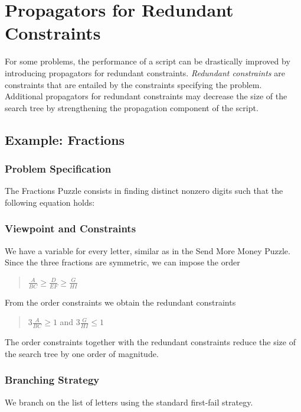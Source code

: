 \documentclass[a4paper,halfparskip]{scrartcl}
\begin{document}
\newpage
\section{Propagators for Redundant Constraints}
\label{redundant}
For some problems, the performance of a script can 
be drastically improved by introducing propagators 
for redundant constraints. \emph{Redundant constraints} are 
constraints that are entailed by the constraints specifying 
the problem. Additional propagators for redundant constraints 
may decrease the size of the search tree by strengthening 
the propagation component of the script.

\subsection{Example: Fractions}
\subsubsection{Problem Specification}
The Fractions Puzzle consists in finding 
distinct nonzero digits such that the following 
equation holds:

\subsubsection{Viewpoint and Constraints}
We have a variable for every letter, similar as 
in the Send More Money Puzzle. Since the three fractions 
are symmetric, we can impose the order 
\begin{quote}
$ \frac{A}{BC} \ge  \frac{D}{EF} \ge  \frac{G}{HI} $
\end{quote}
From the order constraints we obtain the redundant 
constraints 
\begin{quote}
$ 3\frac{A}{BC} \ge 1 $ and $3\frac{G}{HI} \le 1 $
\end{quote}
The order constraints together with the redundant 
constraints reduce the size of the search tree by one order 
of magnitude. 

\subsubsection{Branching Strategy}
We branch on the list of letters using the standard 
first-fail strategy.
\end{document}
